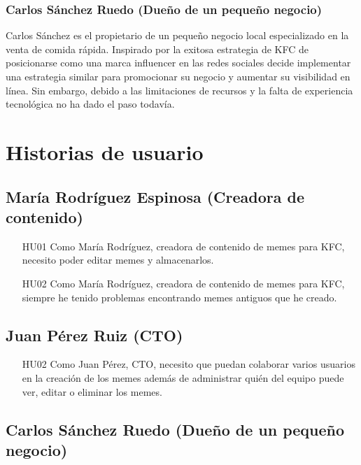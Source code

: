    \subsubsection{Carlos Sánchez Ruedo (Dueño de un pequeño negocio)}

    Carlos Sánchez es el propietario de un pequeño negocio local especializado en la venta de comida rápida. Inspirado por la exitosa estrategia de KFC de posicionarse como una marca influencer en las redes sociales decide implementar una estrategia similar para promocionar su negocio y aumentar su visibilidad en línea. Sin embargo, debido a las limitaciones de recursos y la falta de experiencia tecnológica no ha dado el paso todavía.

\section{Historias de usuario}

    \subsection{María Rodríguez Espinosa (Creadora de contenido)}

    \begin{enumerate}
        \item [HU01] Como María Rodríguez, creadora de contenido de memes para KFC, necesito poder editar memes y almacenarlos.
        \item [HU02] Como María Rodríguez, creadora de contenido de memes para KFC, siempre he tenido problemas encontrando memes antiguos que he creado.
    \end{enumerate}

    \subsection{Juan Pérez Ruiz (CTO)}

        \begin{enumerate}
            \item [HU02] Como Juan Pérez, CTO, necesito que puedan colaborar varios usuarios en la creación de los memes además de administrar quién del equipo puede ver, editar o eliminar los memes.
        \end{enumerate}

    \subsection{Carlos Sánchez Ruedo (Dueño de un pequeño negocio)}


